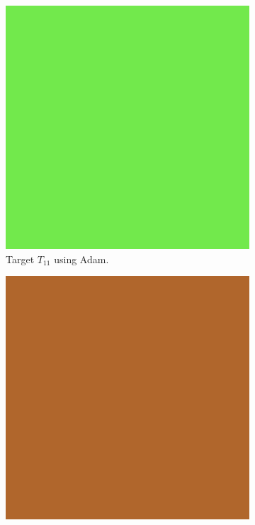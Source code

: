 \begin{figure}[hpb]
\centering
\begin{subfigure}[t]{.25\textwidth}
    \centering
    \includegraphics[width=\linewidth]{img/evaluation/M1/2 param/Neural_Adam_final_render.png}
    \caption{Target $T_{11}$ using Adam.}
    \label{fig:M1NeuralFinalRenders2paramAdam}
\end{subfigure}\hspace{0.7cm}
\begin{subfigure}[t]{.25\textwidth}
    \centering
    \includegraphics[width=\linewidth]{img/evaluation/M1/random/Neural_Adam_random_final.png}

\end{subfigure}
\end{figure}
